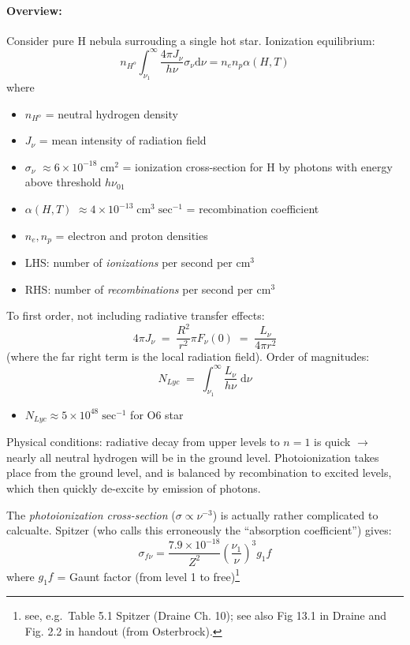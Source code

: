 \documentclass[11pt]{article}
\newcommand{\mar}[1]{\hspace{0pt}\marginpar{-\textcolor{black}{#1}-}}
\begin{document}
\paragraph{Overview:} Consider pure H nebula surrouding a single hot star.
Ionization equilibrium:
\[
    n_{H^{o}}\int_{\nu_{1}}^{\infty}{
        \frac{4\pi{J_{\nu}}}{h\nu}\sigma_{\nu}\mathrm{d}\nu}
    = n_{e}n_{p}\alpha(H,T)
    \]
where
\begin{itemize}
    \item $n_{H^{o}}$ = neutral hydrogen density
    \item $J_{\nu}$ = mean intensity of radiation field
    \item $\sigma_{\nu}$
        $ \approx 6\times10^{-18}\;\mathrm{cm}^{2} $
        = ionization cross-section for H by photons with
        energy above threshold $h\nu_{01}$
    \item $\alpha(H,T)$
        $ \approx 4\times10^{-13}\;\mathrm{cm}^{3}\;\mathrm{sec}^{-1} $
        = recombination coefficient
    \item $n_{e}, n_{p}$ = electron and proton densities
    \item LHS: number of \emph{ionizations} per second per cm$^{3}$
    \item RHS: number of \emph{recombinations} per second per cm$^{3}$
\end{itemize}
To first order, not including radiative transfer effects:
\[
    4\pi{J_{\nu}} \;=\; \frac{R^{2}}{r^{2}}\pi{F_{\nu}}(0) \;=\;
    \frac{L_{\nu}}{4\pi{r^{2}}}
    \]
(where the far right term is the local radiation field). Order of magnitudes:
\[
    N_{Lyc} \;=\; \int_{\nu_{1}}^{\infty}{\frac{L_{\nu}}{h\nu}\;\mathrm{d}\nu}
    \]
\begin{itemize}
    \item $N_{Lyc} \approx 5\times10^{48}\;\mathrm{sec}^{-1}$ for O6 star
\end{itemize}

\mar{54}Physical conditions: radiative decay from upper levels to $n=1$ is
quick $\rightarrow$ nearly all neutral hydrogen will be in the ground
level. Photoionization takes place from the ground level, and is balanced
by recombination to excited levels, which then quickly de-excite by
emission of photons.

The \emph{photoionization cross-section} ($\sigma \propto \nu^{-3}$) is actually
rather complicated to calcualte. Spitzer (who calls this erroneously the
``absorption coefficient'') gives:
\[
    \sigma_{f\nu} = \frac{7.9\times10^{-18}}{Z^{2}}
    \left(\frac{\nu_{1}}{\nu}\right)^{3}g_{1}f
    \]
where $g_{1}f$ = Gaunt factor (from level 1 to free)\footnote{see, e.g.\
Table 5.1 Spitzer (Draine Ch. 10); see also Fig 13.1 in Draine and Fig. 2.2
in handout (from Osterbrock).}
\end{document}
